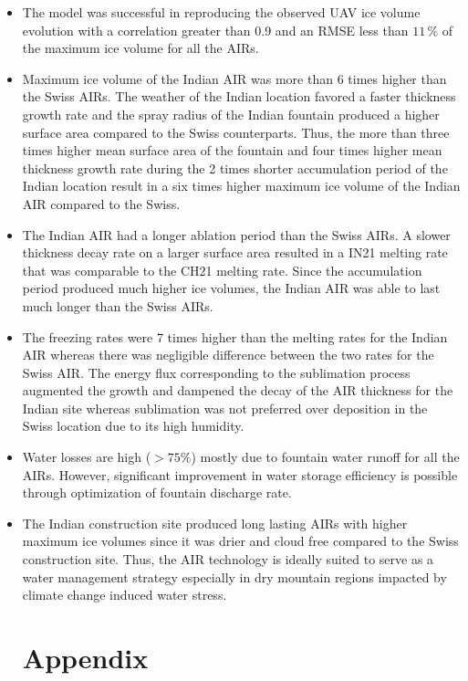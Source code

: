 \documentclass[utf8]{frontiersSCNS}
\begin{document}
\begin{itemize}
\item The model was successful in reproducing the observed UAV ice volume evolution with a correlation greater
than 0.9 and an RMSE less than $11 \, \%$ of the maximum ice volume for all the AIRs.

\item Maximum ice volume of the Indian AIR was more than 6 times higher than the Swiss AIRs. The weather of the
Indian location favored a faster thickness growth rate and the spray radius of the Indian fountain produced a
higher surface area compared to the Swiss counterparts. Thus, the more than three times higher mean surface
area of the fountain and four times higher mean thickness growth rate during the 2 times shorter accumulation
period of the Indian location result in a six times higher maximum ice volume of the Indian AIR compared to
the Swiss.

\item The Indian AIR had a longer ablation period than the Swiss AIRs. A slower thickness decay rate on a larger
surface area resulted in a IN21 melting rate that was comparable to the CH21 melting rate. Since the
accumulation period produced much higher ice volumes, the Indian AIR was able to last much longer than the
Swiss AIRs.

\item The freezing rates were 7 times higher than the melting rates for the Indian AIR whereas there was
negligible difference between the two rates for the Swiss AIR. The energy flux corresponding to the sublimation
process augmented the growth and dampened the decay of the AIR thickness for the Indian site whereas
sublimation was not preferred over deposition in the Swiss location due to its high humidity.

\item Water losses are high ($>75\%$) mostly due to fountain water runoff for all the AIRs. However, significant
improvement in water storage efficiency is possible through optimization of fountain discharge rate.

\item The Indian construction site produced long lasting AIRs with higher maximum ice volumes since it was drier
and cloud free compared to the Swiss construction site. Thus, the AIR technology is ideally suited to serve as
a water management strategy especially in dry mountain regions impacted by climate change induced water
stress.

\section{Appendix}


\end{itemize}
\end{document}
